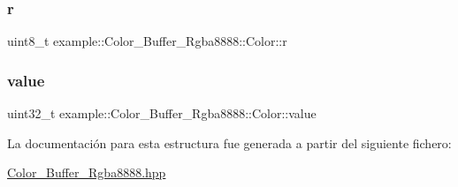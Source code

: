 \subsubsection{\texorpdfstring{r}{r}}
{\footnotesize\ttfamily uint8\+\_\+t example\+::\+Color\+\_\+\+Buffer\+\_\+\+Rgba8888\+::\+Color\+::r}

\mbox{\label{structexample_1_1_color___buffer___rgba8888_1_1_color_aa8c3f5e3038dd7743aab9592023418e4}} 
\subsubsection{\texorpdfstring{value}{value}}
{\footnotesize\ttfamily uint32\+\_\+t example\+::\+Color\+\_\+\+Buffer\+\_\+\+Rgba8888\+::\+Color\+::value}



La documentación para esta estructura fue generada a partir del siguiente fichero\+:\begin{DoxyCompactItemize}
\item 
\mbox{\hyperlink{_color___buffer___rgba8888_8hpp}{Color\+\_\+\+Buffer\+\_\+\+Rgba8888.\+hpp}}\end{DoxyCompactItemize}
